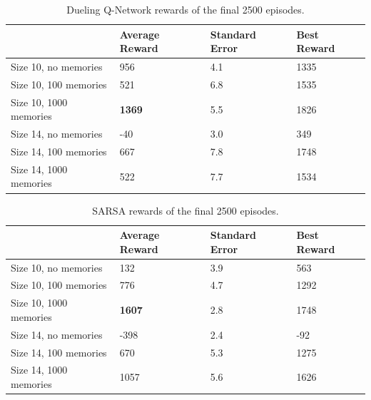 \begin{table}[H]
\begin{tabular}{l|l|l|l|}
\cline{2-4}
\textbf{} & Average Reward & Standard Error & Best Reward \\ \hline
\multicolumn{1}{|l|}{Size 10, no memories} & 956 & 4.1 & 1335 \\ \hline
\multicolumn{1}{|l|}{Size 10, 100 memories} & 521 & 6.8 & 1535 \\ \hline
\multicolumn{1}{|l|}{Size 10, 1000 memories} & \textbf{1369} & 5.5 & 1826 \\ \hline
\multicolumn{1}{|l|}{Size 14, no memories} & -40 & 3.0 & 349 \\ \hline
\multicolumn{1}{|l|}{Size 14, 100 memories} & 667 & 7.8 & 1748 \\ \hline
\multicolumn{1}{|l|}{Size 14, 1000 memories} & 522 & 7.7 & 1534 \\ \hline
\end{tabular}
\caption{Dueling Q-Network rewards of the final 2500 episodes.}
\label{tab:old-2500duel}
\end{table}
\begin{table}[H]
\begin{tabular}{l|l|l|l|}
\cline{2-4}
\textbf{} & Average Reward & Standard Error & Best Reward \\ \hline
\multicolumn{1}{|l|}{Size 10, no memories} & 132 & 3.9 & 563 \\ \hline
\multicolumn{1}{|l|}{Size 10, 100 memories} & 776 & 4.7 & 1292 \\ \hline
\multicolumn{1}{|l|}{Size 10, 1000 memories} & \textbf{1607} & 2.8 & 1748 \\ \hline
\multicolumn{1}{|l|}{Size 14, no memories} & -398 & 2.4 & -92 \\ \hline
\multicolumn{1}{|l|}{Size 14, 100 memories} & 670 & 5.3 & 1275 \\ \hline
\multicolumn{1}{|l|}{Size 14, 1000 memories} & 1057 & 5.6 & 1626 \\ \hline
\end{tabular}
\caption{SARSA rewards of the final 2500 episodes.}
\label{tab:old-2500sarsa}
\end{table}
\clearpage
